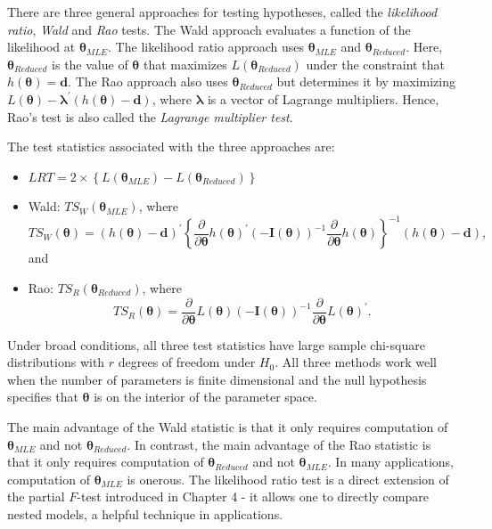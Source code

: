 There are three general approaches for testing hypotheses, called
the \emph{likelihood ratio}, \emph{Wald} and \emph{Rao} tests. The
Wald approach evaluates a function of the likelihood at $\boldsymbol
\theta_{MLE}$. The likelihood ratio approach uses $\boldsymbol
\theta_{MLE}$ and $\boldsymbol \theta_{Reduced}$. Here, $\boldsymbol
\theta_{Reduced}$ is the value of $\boldsymbol \theta$ that
maximizes $L(\boldsymbol \theta_{Reduced})$ under the constraint
that $h(\boldsymbol \theta) = \mathbf{d}$. The Rao approach also
uses $\boldsymbol \theta_{Reduced}$ but determines it by maximizing
$L(\boldsymbol \theta) - \boldsymbol \lambda^{\prime}(h(\boldsymbol
\theta) -\mathbf{d})$, where $\boldsymbol \lambda$ is a vector of
Lagrange multipliers. Hence, Rao's test is also called the
\emph{Lagrange multiplier test}.

The test statistics associated with the three approaches are:
\begin{itemize}
  \item $LRT = 2 \times \left\{L(\boldsymbol \theta_{MLE})-L(\boldsymbol \theta_{Reduced}) \right\}$
  \item Wald: $TS_W(\boldsymbol \theta_{MLE})$, where
\begin{equation*}
TS_W(\boldsymbol \theta)=(h(\boldsymbol \theta)
-\mathbf{d})^{\prime} \left\{ \frac{\partial}{\partial \boldsymbol
\theta} h(\boldsymbol \theta)^{\prime} \left(-\mathbf{I}(\boldsymbol
\theta) \right)^{-1} \frac{\partial}{\partial \boldsymbol \theta}
h(\boldsymbol \theta) \right\}^{-1} (h(\boldsymbol \theta)
-\mathbf{d}),
\end{equation*}
and
  \item Rao: $TS_R(\boldsymbol \theta_{Reduced})$, where
   \begin{equation*}TS_R(\boldsymbol \theta)
  = \frac{\partial}{\partial \boldsymbol \theta} L(\boldsymbol \theta)
  \left(-\mathbf{I}(\boldsymbol \theta) \right)^{-1} \frac{\partial}{\partial \boldsymbol \theta}
  L(\boldsymbol \theta)^{\prime}.
  \end{equation*}
\end{itemize}
Under broad conditions, all three test statistics have large sample
chi-square distributions with $r$ degrees of freedom under $H_0$.
All three methods work well when the number of parameters is finite
dimensional and the null hypothesis specifies that $\boldsymbol
\theta$ is on the interior of the parameter space.


The main advantage of the Wald statistic is that it only requires
computation of $\boldsymbol \theta_{MLE}$ and not $\boldsymbol
\theta_{Reduced}$. In contrast, the main advantage of the Rao
statistic is that it only requires computation of $\boldsymbol
\theta_{Reduced}$ and not $\boldsymbol \theta_{MLE}$. In many
applications, computation of $\boldsymbol \theta_{MLE}$ is onerous.
The likelihood ratio test is a direct extension of the partial
$F$-test introduced in Chapter 4 - it allows one to directly compare
nested models, a helpful technique in applications.



